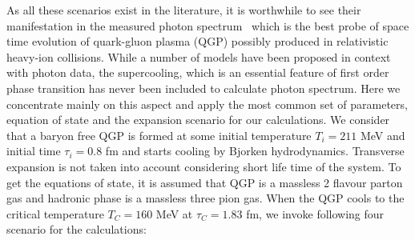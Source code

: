    As all these scenarios exist in the literature, it is worthwhile 
to see their manifestation in the measured photon spectrum~\cite{WA98}
which is the best probe of space time evolution of 
quark-gluon plasma (QGP) possibly produced in relativistic heavy-ion
collisions. While a number of models have been proposed in context 
with photon data, the supercooling, which is an essential feature of 
first order phase transition has never been included to calculate photon 
spectrum. Here we concentrate mainly on this aspect and 
apply the most common set of parameters, equation of state 
and the expansion scenario for our calculations.
 We consider that a baryon free QGP is formed at some initial temperature 
$T_i=211$ MeV and initial time $\tau_i=0.8$ fm and starts cooling by Bjorken 
hydrodynamics. Transverse expansion is not taken into account considering 
short life time of the system. To get the equations of state, it is assumed 
that QGP is a massless 2 flavour parton gas and hadronic phase is a massless 
three pion gas.
 When the QGP cools to the critical temperature $T_C=160$ MeV at 
$\tau_C=1.83$ fm, we invoke following four scenario for the calculations:

